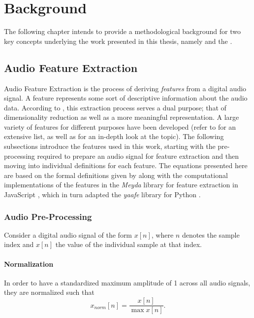 
\section{Background}
\label{sec:background}
The following chapter intends to provide a methodological background for two key
concepts underlying the work presented in this thesis, namely
 and the .

\subsection{Audio Feature Extraction}
\label{subsec:feature_extraction}
Audio Feature Extraction is the process of deriving \textit{features} from a
digital audio signal. A feature represents some sort of descriptive information
about the audio data. According to \citet{lerch2012}, this extraction process
serves a dual purpose; that of dimensionality reduction as well as a more
meaningful representation. A large variety of features for different purposes
have been developed (refer to \citet{peeters2004} for an extensive list, as well
as \citet{lerch2012} for an in-depth look at the topic). The following
subsections introduce the features used in this work, starting with the
pre-processing required to prepare an audio signal for feature extraction and
then moving into individual definitions for each feature. The equations
presented here are based on the formal definitions given by \citet{lerch2012}
along with the computational implementations of the features in the
\textit{Meyda} library for feature extraction in JavaScript
\citep{rawlinson2015}, which in turn adapted the \textit{yaafe} library for
Python \citep{mathieu2010}.

\subsubsection{Audio Pre-Processing}
\label{subsubsec:preprocessing}
Consider a digital audio signal of the form $x[n]$, where $n$ denotes the sample
index and $x[n]$ the value of the individual sample at that index.

\paragraph*{Normalization}
\label{para:normalization}
In order to have a standardized maximum amplitude of 1 across all audio signals,
they are normalized such that
\begin{equation}
  x_{norm}[n] = \frac{x[n]}{\max{x[n]}}.
\end{equation}

